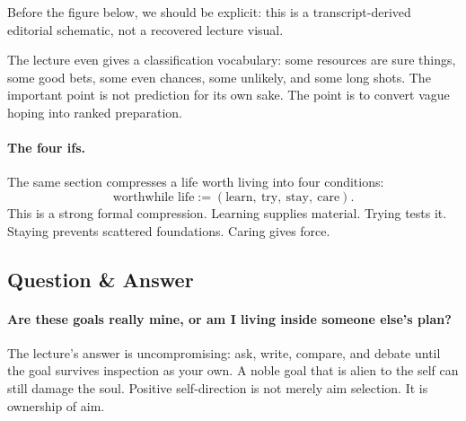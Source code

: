 Before the figure below, we should be explicit: this is a transcript-derived editorial schematic, not a recovered lecture visual.

\begin{figure}
\centering
{}
\end{figure}

The lecture even gives a classification vocabulary: some resources are sure things, some good bets, some even chances, some unlikely, and some long shots. The important point is not prediction for its own sake. The point is to convert vague hoping into ranked preparation.

\paragraph{The four ifs.}
The same section compresses a life worth living into four conditions:
\begin{equation}
\text{worthwhile life} := (\text{learn},\ \text{try},\ \text{stay},\ \text{care}).
\end{equation}
This is a strong formal compression. Learning supplies material. Trying tests it. Staying prevents scattered foundations. Caring gives force.

\subsection{Question \& Answer}

\paragraph{Are these goals really mine, or am I living inside someone else's plan?}
The lecture's answer is uncompromising: ask, write, compare, and debate until the goal survives inspection as your own. A noble goal that is alien to the self can still damage the soul. Positive self-direction is not merely aim selection. It is ownership of aim.


